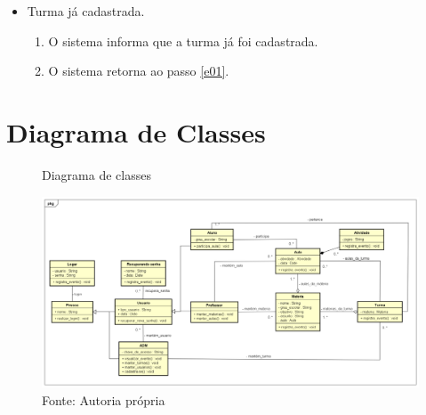 \documentclass{utfpr-pg}
\begin{document}
\begin{itemize}
\begin{itemize}
            \item Turma já cadastrada.
            \begin{enumerate}[label=\textbf{E2.\arabic*}]
                \item \label{e21} O sistema informa que a turma já foi cadastrada.
                \item O sistema retorna ao passo \ref{e01}.
            \end{enumerate}
            
        \end{itemize}
        
    \end{itemize}
\chapter{Diagrama de Classes}
    \begin{figure}[H]
        \centering
        \captionsetup{width=0.9\textwidth}
        \caption{Diagrama de classes}
        \includegraphics[width=\linewidth]{fotos/Diagrama de classe.png}
        \caption*{Fonte: Autoria própria}
        \label{fig:Diagrama de Classes}
    \end{figure}

\end{document}
